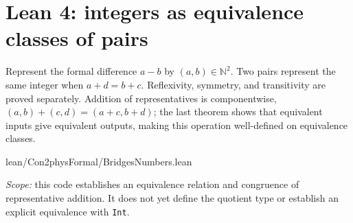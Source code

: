 \section{Lean 4: integers as equivalence classes of pairs}
\label{sec:lean-bridge-10}
Represent the formal difference $a-b$ by $(a,b)\in\mathbb N^2$.
Two pairs represent the same integer when $a+d=b+c$.
Reflexivity, symmetry, and transitivity are proved separately.
Addition of representatives is componentwise,
$(a,b)+(c,d)=(a+c,b+d)$; the last theorem shows that
equivalent inputs give equivalent outputs, making this operation
well-defined on equivalence classes.


{lean/Con2physFormal/BridgesNumbers.lean}

\noindent\textit{Scope:} this code establishes an equivalence relation
and congruence of representative addition. It does not yet define
the quotient type or establish an explicit equivalence with \texttt{Int}.
